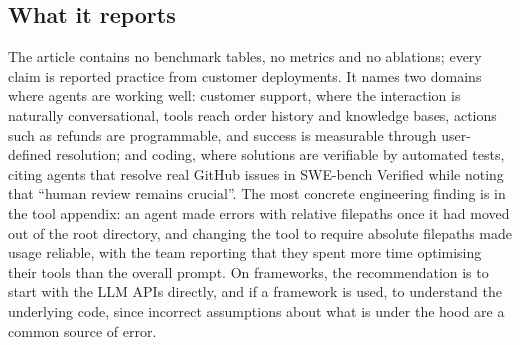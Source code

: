 \begin{center}
\end{center}

\subsection{What it reports}

The article contains no benchmark tables, no metrics and no ablations; every claim is reported practice from customer deployments. It names two domains where agents are working well: customer support, where the interaction is naturally conversational, tools reach order history and knowledge bases, actions such as refunds are programmable, and success is measurable through user-defined resolution; and coding, where solutions are verifiable by automated tests, citing agents that resolve real GitHub issues in SWE-bench Verified while noting that ``human review remains crucial''. The most concrete engineering finding is in the tool appendix: an agent made errors with relative filepaths once it had moved out of the root directory, and changing the tool to require absolute filepaths made usage reliable, with the team reporting that they spent more time optimising their tools than the overall prompt. On frameworks, the recommendation is to start with the LLM APIs directly, and if a framework is used, to understand the underlying code, since incorrect assumptions about what is under the hood are a common source of error.

